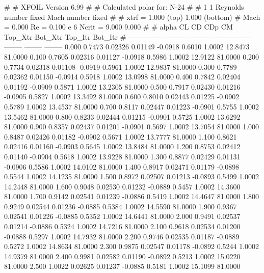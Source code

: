 #  
#       XFOIL         Version 6.99
#  
# Calculated polar for: N-24                                            
#  
# 1 1 Reynolds number fixed          Mach number fixed         
#  
# xtrf =   1.000 (top)        1.000 (bottom)  
# Mach =   0.000     Re =     0.100 e 6     Ncrit =   9.000  9.000
#  
#   alpha    CL        CD       CDp       CM     Top_Xtr  Bot_Xtr  Top_Itr  Bot_Itr
#  ------ -------- --------- --------- -------- -------- -------- -------- --------
   0.000   0.7473   0.02326   0.01149  -0.0918   0.6010   1.0002  12.8473  81.0000
   0.100   0.7605   0.02316   0.01127  -0.0918   0.5986   1.0002  12.9122  81.0000
   0.200   0.7734   0.02318   0.01108  -0.0919   0.5961   1.0002  12.9837  81.0000
   0.300   0.7789   0.02362   0.01150  -0.0914   0.5918   1.0002  13.0998  81.0000
   0.400   0.7842   0.02404   0.01192  -0.0909   0.5871   1.0002  13.2305  81.0000
   0.500   0.7917   0.02430   0.01216  -0.0905   0.5827   1.0002  13.3492  81.0000
   0.600   0.8010   0.02443   0.01225  -0.0902   0.5789   1.0002  13.4537  81.0000
   0.700   0.8117   0.02447   0.01223  -0.0901   0.5755   1.0002  13.5462  81.0000
   0.800   0.8233   0.02444   0.01215  -0.0901   0.5725   1.0002  13.6292  81.0000
   0.900   0.8357   0.02437   0.01201  -0.0901   0.5697   1.0002  13.7054  81.0000
   1.000   0.8487   0.02426   0.01182  -0.0902   0.5671   1.0002  13.7777  81.0000
   1.100   0.8621   0.02416   0.01160  -0.0903   0.5645   1.0002  13.8484  81.0000
   1.200   0.8753   0.02412   0.01140  -0.0904   0.5618   1.0002  13.9228  81.0000
   1.300   0.8877   0.02429   0.01131  -0.0906   0.5586   1.0002  14.0102  81.0000
   1.400   0.8917   0.02471   0.01179  -0.0898   0.5544   1.0002  14.1235  81.0000
   1.500   0.8972   0.02507   0.01213  -0.0893   0.5499   1.0002  14.2448  81.0000
   1.600   0.9048   0.02530   0.01232  -0.0889   0.5457   1.0002  14.3600  81.0000
   1.700   0.9142   0.02541   0.01239  -0.0886   0.5419   1.0002  14.4647  81.0000
   1.800   0.9249   0.02544   0.01236  -0.0885   0.5384   1.0002  14.5590  81.0000
   1.900   0.9367   0.02541   0.01226  -0.0885   0.5352   1.0002  14.6441  81.0000
   2.000   0.9491   0.02537   0.01214  -0.0886   0.5324   1.0002  14.7216  81.0000
   2.100   0.9618   0.02534   0.01200  -0.0888   0.5297   1.0002  14.7932  81.0000
   2.200   0.9746   0.02535   0.01187  -0.0889   0.5272   1.0002  14.8634  81.0000
   2.300   0.9875   0.02547   0.01178  -0.0892   0.5244   1.0002  14.9379  81.0000
   2.400   0.9981   0.02582   0.01190  -0.0892   0.5213   1.0002  15.0220  81.0000
   2.500   1.0022   0.02625   0.01237  -0.0885   0.5181   1.0002  15.1099  81.0000
